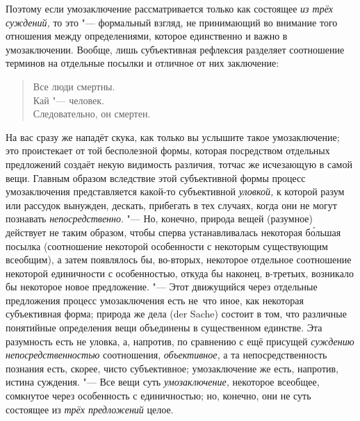 Поэтому если умозаключение рассматривается только как
состоящее {\em из трёх суждений,}
то это "--- формальный взгляд, не принимающий во
внимание того отношения между определениями, которое единственно и важно в
умозаключении. Вообще, лишь субъективная рефлексия разделяет соотношение
терминов на отдельные посылки и отличное от них заключение:

\begin{verse}
Все люди смертны.\\
Кай "--- человек.\\
Следовательно, он смертен.
\end{verse}

На вас сразу же нападёт скука, как только вы услышите такое
умозаключение; это проистекает от той бесполезной формы, которая
посредством отдельных предложений создаёт некую видимость различия, тотчас
же исчезающую в самой вещи. Главным образом вследствие этой субъективной
формы процесс умозаключения представляется какой-то субъективной
{\em уловкой,} к которой разум или рассудок вынужден, дескать, прибегать
в тех случаях, когда они не могут познавать {\em непосредственно}.
"--- Но, конечно, природа вещей (разумное) действует не таким
образом, чтобы сперва устанавливалась некоторая б\'{о}льшая посылка
(соотношение некоторой особенности с некоторым существующим всеобщим), а
затем появлялось бы, во-вторых, некоторое отдельное соотношение некоторой
единичности с особенностью, откуда бы наконец, в-третьих, возникало бы
некоторое новое предложение. "--- \label{bkm:bm52a}Этот
движущийся через отдельные предложения процесс умозаключения есть
не~что иное, как некоторая субъективная форма; природа же дела (der Sache)
состоит в том, что различные понятийные определения вещи объединены в
существенном единстве. Эта разумность есть не уловка, а, напротив, по сравнению
с ещё присущей {\em суждению непосредственностью} соотношения, {\em
объективное,} а та непосредственность познания есть, скорее, чисто
субъективное; умозаключение же есть, напротив, истина суждения. "--- Все вещи
суть {\em умозаключение,} некоторое всеобщее, сомкнутое через особенность с
единичностью; но, конечно, они не суть состоящее из {\em трёх предложений}
целое.

